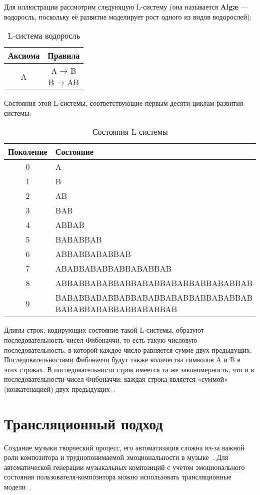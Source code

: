 Для иллюстрации рассмотрим следующую L-систему (она называется \textbf{Algæ} — водоросль, поскольку её развитие моделирует рост одного из видов водорослей):

\begin{table}[H]
		\centering
	\caption{L-система водоросль}
	\begin{tabular}{|c|c|}
		\hline
		Аксиома & Правила \\
		\hline
		A & \makecell{A → B \\ B → AB} \\
		\hline
	\end{tabular}
\end{table}

Состояния этой L-системы, соответствующие первым десяти циклам развития системы:
\begin{table}[H]
	\centering
	\caption{Состояния L-системы}
	\begin{tabular}{|c|p{12cm}|}
		\hline
		Поколение & Состояние \\
		\hline
		0 & A \\
		\hline
		1 & B \\
		\hline
		2 & AB \\
		\hline
		3 & BAB \\
		\hline
		4 & ABBAB \\
		\hline
		5 & BABABBAB \\
		\hline
		6 & ABBABBABABBAB \\
		\hline
		7 & ABABBABABBABBABABBAB \\
		\hline
		8 & ABBABBABABBABBABABBABABBABBABABBAB \\
		\hline
		9 & BABABBABABBABBABABBABABBABBABABBAB
		BABABBABABBABBABABBAB \\
		\hline
	\end{tabular}
\end{table}

Длины строк, кодирующих состояние такой L-системы, образуют последовательность чисел Фибоначчи, то есть такую числовую последовательность, в которой каждое число равняется сумме двух предыдущих. Последовательностями Фибоначчи будут также количества символов A и B в этих строках. В последовательности строк имеется та же закономерность, что и в последовательности чисел Фибоначчи: каждая строка является «суммой» (конкатенацией) двух предыдущих~\cite{l-systems}.

\section{Трансляционный подход}
Создание музыки творческий процесс, его автоматизация сложна из-за важной роли композитора и труднопонимаемой эмоциональности в музыке~\cite{big}.
Для автоматической генерации музыкальных композиций с учетом эмоционального состояния пользователя-композитора можно использовать трансляционные модели~\cite{web}.

